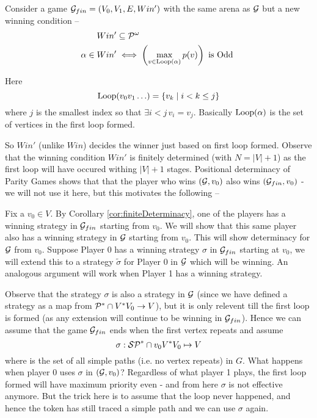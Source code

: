 Consider a game $\mathcal{G}_{fin}=(V_0,V_1,E,Win')$ with the same arena as $\mathcal{G}$ but a new winning condition -- 
\begin{align}
    Win' &\subseteq \mathcal{P}^\omega\\
    \alpha \in Win' &\iff \left(\max_{v \in \operatorname*{Loop}(\alpha)} p(v)\right) \text{ is Odd }
\end{align}

Here 
\begin{equation}
    \operatorname*{Loop}(v_0v_1\ldots) = \{ v_k \mid i < k \leq j \} \label{def:loop}
\end{equation}
where $j$ is the smallest index so that $\exists i < j \, v_i = v_j$. Basically $\operatorname*{Loop}(\alpha)$ is the set of vertices in the first loop formed.

So $Win'$ (unlike $Win$) decides the winner just based on first loop formed. Observe that the winning condition $Win'$ is finitely determined (with $N=|V|+1$) as the first loop will have occured withing $|V|+1$ stages. Positional determinacy of Parity Games shows that that the player who wins $(\mathcal{G},v_0)$ also wins $(\mathcal{G}_{fin},v_0)$ - we will not use it here, but this motivates the following --

Fix a $v_0 \in V$. By Corollary \ref{cor:finiteDeterminacy}, one of the players has a winning strategy in $\mathcal{G}_{fin}$ starting from $v_0$. We will show that this same player also has a winning strategy in $\mathcal{G}$ starting from $v_0$. This will show determinacy for $\mathcal{G}$ from $v_0$. Suppose Player 0 has a winning strategy $\sigma$ in $\mathcal{G}_{fin}$ starting at $v_0$, we will extend this to a strategy $\tilde{\sigma}$ for Player 0 in $\mathcal{G}$ which will be winning. An analogous argument will work when Player 1 has a winning strategy.

Observe that the strategy $\sigma$ is also a strategy in $\mathcal{G}$ (since we have defined a strategy as a map from $\mathcal{P}^{*} \cap V^*V_0 \to V$), but it is only relevent till the first loop is formed (as any extension will continue to be winning in $\mathcal{G}_{fin}$). Hence we can assume that the game $\mathcal{G}_{fin}$ ends when the first vertex repeats and assume
\[
    \sigma : \mathcal{SP}^* \cap v_0V^*V_0 \mapsto V
\]
where \SP is the set of all simple paths (i.e. no vertex repeats) in $G$. What happens when player 0 uses $\sigma$ in $(\mathcal{G},v_0)$? Regardless of what player 1 plays, the first loop formed will have maximum priority even - and from here $\sigma$ is not effective anymore. But the trick here is to assume that the loop never happened, and hence the token has still traced a simple path and we can use $\sigma$ again.  

